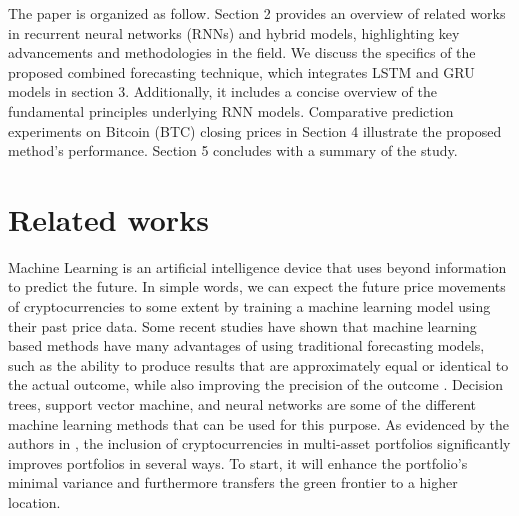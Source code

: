 \documentclass[]{interact}
\theoremstyle{plain}%
\theoremstyle{definition}
\theoremstyle{remark}
\begin{document}
The paper is organized as follow. Section 2 provides an overview of
related works in recurrent neural networks (RNNs) and hybrid models,
highlighting key advancements and methodologies in the field. We discuss
the specifics of the proposed combined forecasting technique, which
integrates LSTM and GRU models in section 3. Additionally, it includes a
concise overview of the fundamental principles underlying RNN models.
Comparative prediction experiments on Bitcoin (BTC) closing prices in
Section 4 illustrate the proposed method's performance. Section 5
concludes with a summary of the study.

\section{Related works}\label{related-works}

Machine Learning is an artificial intelligence device that uses beyond
information to predict the future. In simple words, we can expect the
future price movements of cryptocurrencies to some extent by training a
machine learning model using their past price data. Some recent studies
have shown that machine learning based methods have many advantages of
using traditional forecasting models, such as the ability to produce
results that are approximately equal or identical to the actual outcome,
while also improving the precision of the outcome \citep{hitam2021}.
Decision trees, support vector machine, and neural networks are some of
the different machine learning methods that can be used for this
purpose. As evidenced by the authors in \citep{andrianto17}, the
inclusion of cryptocurrencies in multi-asset portfolios significantly
improves portfolios in several ways. To start, it will enhance the
portfolio's minimal variance and furthermore transfers the green
frontier to a higher location.
\end{document}
